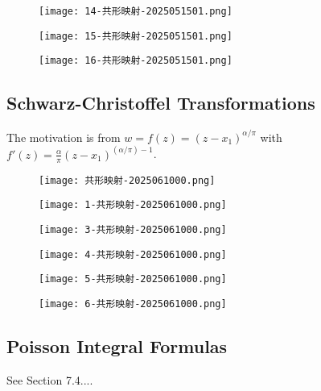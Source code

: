 \begin{figure}[H]
\centering
\texttt{[image: 14-共形映射-2025051501.png]}
\label{}
\end{figure}
\begin{figure}[H]
\centering
\texttt{[image: 15-共形映射-2025051501.png]}
\label{}
\end{figure}
\begin{figure}[H]
\centering
\texttt{[image: 16-共形映射-2025051501.png]}
\label{}
\end{figure}

\subsection{Schwarz-Christoffel Transformations}

The motivation is from $w=f(z)=(z-x_1)^{\alpha/\pi}$ with $f'(z)=\frac{\alpha}{\pi}(z-x_1)^{(\alpha/\pi)-1}$.

\begin{figure}[H]
\centering
\texttt{[image: 共形映射-2025061000.png]}
\label{}
\end{figure}
\begin{figure}[H]
\centering
\texttt{[image: 1-共形映射-2025061000.png]}
\label{}
\end{figure}
\begin{figure}[H]
\centering
\texttt{[image: 3-共形映射-2025061000.png]}
\label{}
\end{figure}
\begin{figure}[H]
\centering
\texttt{[image: 4-共形映射-2025061000.png]}
\label{}
\end{figure}
\begin{figure}[H]
\centering
\texttt{[image: 5-共形映射-2025061000.png]}
\label{}
\end{figure}
\begin{figure}[H]
\centering
\texttt{[image: 6-共形映射-2025061000.png]}
\label{}
\end{figure}

\subsection{Poisson Integral Formulas}

See Section 7.4....

